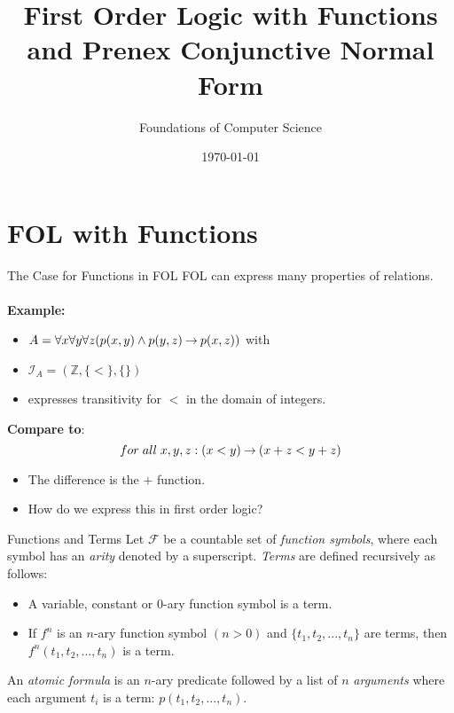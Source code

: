 \documentclass[style=sailor,size=12pt,mode=present]{powerdot}
\title{First Order Logic with Functions and Prenex Conjunctive Normal Form}
\author{Foundations of Computer Science}
\date{\today}
\theoremstyle{definition}
\newenvironment{defn}[1]
  {\renewcommand\theinnerdefn{#1}\innerdefn}
  {\endinnerdefn}
\newcommand{\bb}[1]{\mathbb{#1}}
\newcommand{\Z}{\bb{Z}}
\begin{document}
\maketitle
\section[slide=false]{FOL with Functions}
\begin{slide}[bm=,toc=]{The Case for Functions in FOL}
FOL can express many properties of relations. 
\\~\\
{\bf Example:}
\begin{itemize}
\item $A = \forall x \forall y \forall z (p(x,y) \land p (y,z) \mathbin{\rightarrow} p(x,z))$ with
\item $\mathcal{I}_A = (\Z,\{<\},\{\})$
\item expresses transitivity for $<$ in the domain of integers.
\end{itemize}
\vspace{2ex}
{\bf Compare to}:
\[
  for\; all\;  x,y,z: (x < y) \mathbin{\rightarrow} (x + z < y + z)
  \]

\vspace{-1ex}
\begin{itemize}
\item The difference is the $+$ function.
\item How do we express this in first order logic?
\end{itemize}

\end{slide}

\begin{wideslide}[bm=,toc=]{Functions and Terms}
\begin{defn}{9.1}[Ben Ari]
Let $\mathcal{F}$ be a countable set of \emph{function symbols}, where
each symbol has an \emph{arity} denoted by a superscript. \emph{Terms} are
defined recursively as follows:
\end{defn}
\vspace{-2ex}
\begin{itemize}
\item A variable, constant or $0$-ary function symbol is a term.
\item If $f^n$ is an $n$-ary function symbol $(n > 0)$ and $\{t_1,t_2,...,t_n\}$
are terms, then $f^n(t_1,t_2,...,t_n)$ is a term.
\end{itemize}
An \emph{atomic formula} is an $n$-ary predicate followed by a list of $n$
\emph{arguments} where each argument $t_i$ is a term: $p(t_1,t_2,...,t_n)$.

\end{wideslide}
\end{document}
